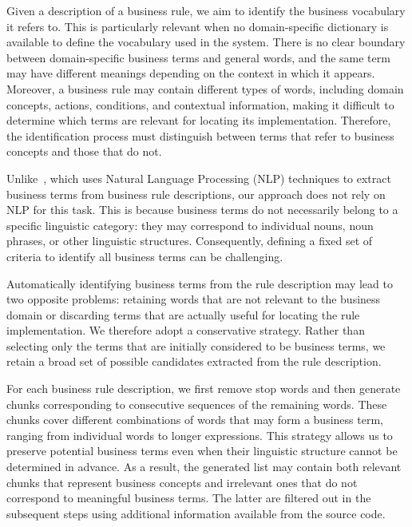Given a description of a business rule, we aim to identify the business vocabulary it refers to. This is particularly relevant when no domain-specific dictionary is available to define the vocabulary used in the system. There is no clear boundary between domain-specific business terms and general words, and the same term may have different meanings depending on the context in which it appears. Moreover, a business rule may contain different types of words, including domain concepts, actions, conditions, and contextual information, making it difficult to determine which terms are relevant for locating its implementation. Therefore, the identification process must distinguish between terms that refer to business concepts and those that do not.

Unlike~\cite{Ayac26a}, which uses Natural Language Processing (NLP) techniques to extract business terms from business rule descriptions, our approach does not rely on NLP for this task. This is because business terms do not necessarily belong to a specific linguistic category: they may correspond to individual nouns, noun phrases, or other linguistic structures. Consequently, defining a fixed set of criteria to identify all business terms can be challenging.

Automatically identifying business terms from the rule description may lead to two opposite problems: retaining words that are not relevant to the business domain or discarding terms that are actually useful for locating the rule implementation. We therefore adopt a conservative strategy. Rather than selecting only the terms that are initially considered to be business terms, we retain a broad set of possible candidates extracted from the rule description.

For each business rule description, we first remove stop words and then generate chunks corresponding to consecutive sequences of the remaining words. These chunks cover different combinations of words that may form a business term, ranging from individual words to longer expressions. This strategy allows us to preserve potential business terms even when their linguistic structure cannot be determined in advance. As a result, the generated list may contain both relevant chunks that represent business concepts and irrelevant ones that do not correspond to meaningful business terms. The latter are filtered out in the subsequent steps using additional information available from the source code.

